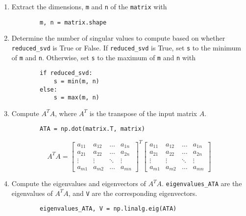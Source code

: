 \documentclass{article} %
\theoremstyle{definition}
\theoremstyle{remark}
\theoremstyle{plain}
\begin{document}
    \begin{enumerate}
        \item Extract the dimensions, \verb|m| and \verb|n| of the \verb|matrix| with
    
        \begin{verbatim}
        m, n = matrix.shape
        \end{verbatim}
    
        \item Determine the number of singular values to compute based on whether \verb|reduced_svd| is True or False.
         If \verb|reduced_svd| is True, set \verb|s| to the minimum of \verb|m| and \verb|n|. Otherwise, set \verb|s| to the maximum of \verb|m| and \verb|n| with
    
    
        \begin{verbatim}
        if reduced_svd:
            s = min(m, n)
        else:
            s = max(m, n)
        \end{verbatim}
    
        \item Compute \(A^T A\), where \(A^T\) is the transpose of the input matrix \(A\).
    
        \begin{verbatim}
        ATA = np.dot(matrix.T, matrix)
        \end{verbatim}
    
        \[
        A^T A = \begin{bmatrix} a_{11} & a_{12} & \dots & a_{1n} \\ a_{21} & a_{22} & \dots & a_{2n} \\ \vdots & \vdots & \ddots & \vdots \\ a_{m1} & a_{m2} & \dots & a_{mn} \end{bmatrix}^T
        \begin{bmatrix} a_{11} & a_{12} & \dots & a_{1n} \\ a_{21} & a_{22} & \dots & a_{2n} \\ \vdots & \vdots & \ddots & \vdots \\ a_{m1} & a_{m2} & \dots & a_{mn} \end{bmatrix}
        \]

        \item Compute the eigenvalues and eigenvectors of \(A^T A\).
        \verb|eigenvalues_ATA| are the eigenvalues of \(A^T A\), and \verb|V| are the corresponding eigenvectors.



        \begin{verbatim}
        eigenvalues_ATA, V = np.linalg.eig(ATA)
        \end{verbatim}
        

\end{enumerate}
\end{document}
